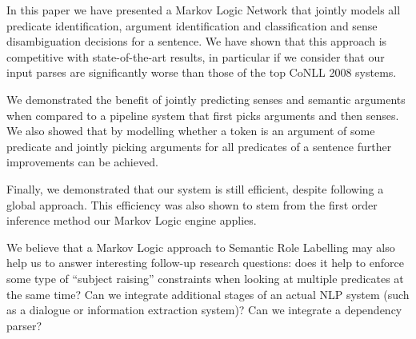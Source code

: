 In this paper we have presented a Markov Logic Network that jointly
models all predicate identification, argument identification and
classification and sense disambiguation decisions for a sentence. We
have shown that this approach is competitive with state-of-the-art
results, in particular if we consider that our input parses are
significantly worse than those of the top CoNLL 2008 systems. 

We demonstrated the
benefit of jointly predicting senses and semantic arguments when
compared to a pipeline system that first picks arguments and then
senses. We also showed that by modelling whether a token is an
argument of some predicate and jointly picking arguments for all
predicates of a sentence further improvements can be achieved.  

Finally, we demonstrated that our system is still efficient, despite
following a global approach. This efficiency was also shown to stem
from the first order inference method our Markov Logic engine
applies. 

We believe that a Markov Logic approach to Semantic Role Labelling may
also help us to answer interesting follow-up research questions: does it help to
enforce some type of ``subject raising'' constraints when looking at
multiple predicates at the same time? Can we integrate additional
stages of an actual NLP system (such as a dialogue or information
extraction system)? Can we integrate a dependency parser?     
